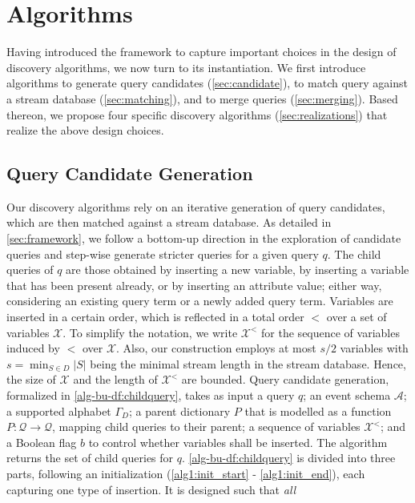 
\section{\sys{} Algorithms}
\label{sec:algos}
Having introduced the \sys{} framework to capture important choices in the
design of discovery algorithms, we now turn to its instantiation. We
first introduce algorithms to generate query
candidates (\autoref{sec:candidate}), to match query against a stream
database (\autoref{sec:matching}), and to merge queries
(\autoref{sec:merging}). Based thereon, we propose four specific
discovery algorithms (\autoref{sec:realizations}) that realize the above
design choices.
\subsection{Query Candidate Generation}
\label{sec:candidate}
Our discovery algorithms rely on an iterative generation of query candidates,
which are then matched against a stream database. As detailed in
\autoref{sec:framework}, we follow a
bottom-up direction in the exploration of candidate queries and step-wise
generate stricter queries for a given query $q$. 
The child queries of $q$ are those obtained by inserting
a new variable, by inserting a variable that has been present already, or by
inserting an attribute value; either way, considering an existing query term
or a newly added query term.
Variables are inserted in a certain order, which
is reflected in a total order $<$ over a set of variables $\mathcal{X}$. To
simplify the notation, we write $\mathcal{X}^<$ for the sequence of
variables induced by $<$ over $\mathcal{X}$. Also, our
construction employs at most $s/2$ variables with $s=\min_{S\in D} |S|$
being the minimal stream length in the stream database. Hence, the size of
$\mathcal{X}$ and the length of $\mathcal{X}^<$ are bounded.
Query candidate generation, formalized in
\autoref{alg-bu-df:childquery}, takes as input a query $q$; an event
schema $\mathcal{A}$; a supported alphabet $\Gamma_D$; a parent dictionary
$P$ that is modelled as a
function $P: \mathcal{Q} \to \mathcal{Q}$, mapping child queries to their
parent; a sequence of variables $\mathcal{X}^<$; and a Boolean flag $b$ to
control whether variables shall be inserted. The algorithm returns the set
of child queries for $q$.
\autoref{alg-bu-df:childquery} is divided into three parts, following an
initialization (\autoref{alg1:init_start} - \ref{alg1:init_end}),
each capturing one type of insertion. It is designed such that \emph{all}

